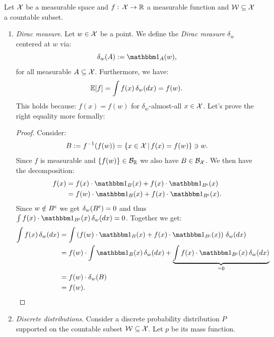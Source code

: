 \begin{Eg} Let $\mathcal{X}$ be a measurable space and $f:\,\mathcal{X} \to \mathbb{R}$ a measurable function and $\mathcal{W} \subseteq \mathcal{X}$ a countable subset.
    \begin{enumerate}
        \item \emph{Dirac measure}. Let $w \in \mathcal{X}$ be a point. We define the \emph{Dirac measure} $\delta_{w}$ centered at $w$ via:
            \[ \delta_{w}(A) := \I_A(w),\]
            for all measurable $A \subseteq \mathcal{X}$. Furthermore, we have:
            \[ \mathbb{E}[f] =  \int f(x)\,\delta_{w}(dx)   = f(w).\]
            This holds because: $f(x) = f(w)$ for $\delta_{w}$-almost-all $x \in \mathcal{X}$.
            Let's prove the right equality more formally:
            \begin{proof}
            Consider:
            \[B:= f^{-1}(f(w))=\{x \in \mathcal{X}\,|\,f(x)=f(w) \} \ni w.\]
            Since $f$ is measurable and $\{f(w)\} \in \mathcal{B}_{\mathbb{R}}$ we also have $B \in \mathcal{B}_{\mathcal{X}}$.
            We then have the decomposition:
            \begin{align*}
                f(x) &= f(x) \cdot \I_B(x) + f(x) \cdot \I_{B^\cmpl}(x) \\
                &= f(w) \cdot \I_B(x) + f(x) \cdot \I_{B^\cmpl}(x).
        \end{align*}
        Since $w \notin B^{\mathsf{c}}$ we get $\delta_{w}(B^{\mathsf{c}}) =0$ and thus $\int f(x) \cdot \I_{B^\cmpl}(x)\, \delta_{w}(dx) = 0$.
        Together we get:
        \begin{align*}
            \int f(x)\,\delta_{w}(dx) & =  \int \lp f(w) \cdot \I_B(x) + f(x) \cdot \I_{B^\cmpl}(x) \rp \, \delta_{w}(dx) \\
            & =  f(w) \cdot \int  \I_B(x)\,\delta_{w}(dx) + \underbrace{\int  f(x) \cdot \I_{B^\cmpl}(x)  \, \delta_{w}(dx)}_{=0} \\
            & = f(w) \cdot \delta_{w}(B) \\
            & = f(w).
        \end{align*}
            \end{proof}
        \item \emph{Discrete distributions}. Consider a discrete probability distribution $P$ supported on the countable subset $\mathcal{W} \subseteq \mathcal{X}$. 
            Let $p$ be its mass function.

\end{enumerate}
\end{Eg}
